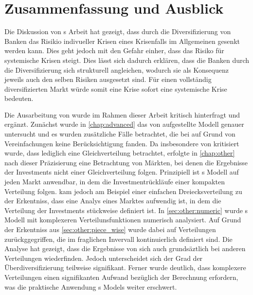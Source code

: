 
\chapter{Zusammenfassung und Ausblick}%
\label{chap:conclusion}

Die Diskussion von \citeauthor{Wagner-2010}s Arbeit hat gezeigt, dass durch die Diversifizierung von Banken das Risikio indivueller Krisen \bzw{} eines Krisenfalls im Allgemeinen gesenkt werden kann. Dies geht jedoch mit den Gefahr einher, dass das Risiko für systemische Krisen steigt. Dies lässt sich dadurch erklären, dass die Banken durch die Diversifizierung sich strukturell angleichen, wodurch sie als Konsequenz jeweils auch den selben Risiken ausgesetzt sind. Für einen vollständig diversifizierten Markt würde somit eine Krise sofort eine systemische Krise bedeuten.

Die Ausarbeitung von \citeauthor{Wagner-2010} wurde im Rahmen dieser Arbeit kritisch hinterfragt und ergänzt. Zunächst wurde in \cref{chap:advanced} das von \citeauthor{Wagner-2010} aufgestellte Modell genauer untersucht und es wurden zusätzliche Fälle betrachtet, die bei \citeauthor{Wagner-2010} auf Grund von Vereinfachungen keine Berücksichtigung fanden. Da insbesondere von \textcite{Ibragimov-2011} kritisiert wurde, dass \citeauthor{Wagner-2010} lediglich eine Gleichverteilung betrachtet, erfolgte in \cref{chap:other} nach dieser Präzisierung eine Betrachtung von Märkten, bei denen die Ergebnisse der Investments nicht einer Gleichverteilung folgen. Prinzipiell ist \citeauthor{Wagner-2010}s Modell auf jeden Markt anwendbar, in dem die Investmentrückläufe einer kompakten Verteilung folgen.  kam jedoch am Beispiel einer einfachen Dreiecksverteilung zu der Erkentniss, dass eine Analys eines Marktes aufwendig ist, in dem die Verteilung der Investments stückweise definiert ist. In \cref{sec:other:numeric} wurde \citeauthor{Wagner-2010}s Modell mit komplexeren Verteilunsfunktionen numerisch analysiert. Auf Grund der Erkentniss aus \cref{sec:other:piece_wise} wurde dabei auf Verteilungen zurückggegriffen, die im fraglichen Invervall kontinuierlich definiert sind. Die Analyse hat gezeigt, dass die Ergebnisse von \citeauthor{Wagner-2010} sich auch grundsäztlich bei anderen Verteilungen wiederfinden. Jedoch unterscheidet sich der Grad der Überdiversifizierung teilweise signifikant. Ferner wurde deutlich, dass komplexere Verteilungen einen signifikanten Aufwand bezüglich der Berechnung erfordern, was die praktische Anwendung \citeauthor{Wagner-2010}s Models weiter erschwert.


